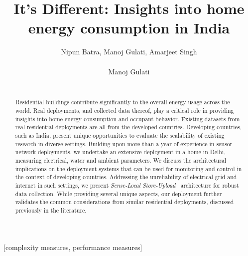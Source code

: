 \documentclass[10pt]{sensys-proc}
\author{
%
\alignauthor Nipun Batra, Manoj Gulati, Amarjeet Singh \\
\affaddr{Indraprastha Institute of Information Technology, Delhi}\\
\email{\{nipunb,manojg,amarjeet\}@iiitd.ac.in\vspace{-5mm}}
\alignauthor Manoj Gulati \\
    \affaddr{IIIT Delhi}\\
    \email{manojg@iiitd.ac.in\vspace{-10mm}}
}
\title{It's Different: Insights into home energy consumption in India\vspace{-3mm}}
\newcommand{\paradigms}{Sense-Local Store-Upload~}
\begin{document}
\maketitle


\begin{abstract}
Residential buildings contribute significantly to the overall energy usage across the world. Real deployments, and collected data thereof, play a critical role in providing insights into home energy consumption and occupant behavior. %
Existing datasets from real residential deployments are all from the developed countries. Developing countries, such as India, present unique opportunities to evaluate the scalability of existing research in diverse settings. Building upon more than a year of experience in sensor network deployments, we undertake an extensive deployment in a home in Delhi, measuring electrical, water and ambient parameters. We discuss the architectural implications on the deployment systems that can be used for monitoring and control in the context of developing countries. Addressing the unreliability of electrical grid and internet in such settings, we present \emph{\paradigms} architecture for robust data collection.
While providing several unique aspects, our deployment further validates the common considerations from similar residential deployments, discussed previously in the literature. %
\end{abstract}

[complexity measures, performance measures]



\vspace{-1mm}
\end{document}
